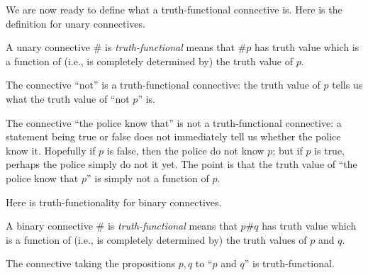 \documentclass[../notes.tex]{subfiles}
\begin{document}
We are now ready to define what a truth-functional connective is. Here is the definition for unary connectives.
\begin{definition}
	A unary connective $\#$ is \textit{truth-functional} means that $\#p$ has truth value which is a function of (i.e., is completely determined by) the truth value of $p$.
\end{definition}
\begin{example}
	The connective ``not'' is a truth-functional connective: the truth value of $p$ tells us what the truth value of ``not $p$'' is.
\end{example}
\begin{nex}
	The connective ``the police know that'' is not a truth-functional connective: a statement being true or false does not immediately tell us whether the police know it. Hopefully if $p$ is false, then the police do not know $p$; but if $p$ is true, perhaps the police simply do not it yet. The point is that the truth value of ``the police know that $p$'' is simply not a function of $p$.
\end{nex}
Here is truth-functionality for binary connectives.
\begin{definition}
	A binary connective $\#$ is \textit{truth-functional} means that $p\#q$ has truth value which is a function of (i.e., is completely determined by) the truth values of $p$ and $q$.
\end{definition}
\begin{example}
	The connective taking the propositions $p,q$ to ``$p$ and $q$'' is truth-functional.
\end{example}
\end{document}
